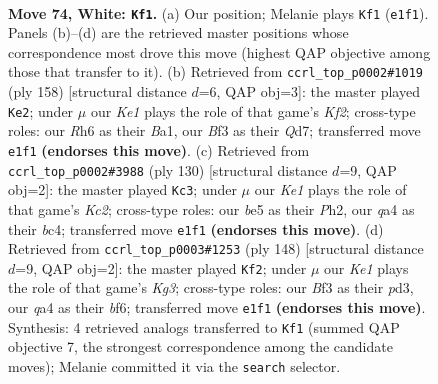 \documentclass[11pt]{article}
\begin{document}
\clearpage

\begin{figure}[p]\centering
\begin{subfigure}{0.46\textwidth}\centering
\resizebox{\linewidth}{!}{%
\newchessgame
\chessboard[
  setfen={8/8/7R/4b3/q7/1p1k1B2/8/4K3 w - - 4 74},
  showmover=false,
  pgfstyle=straightmove, color=movearrow, markmove={e1-f1}
]}
\caption{}
\end{subfigure}\hfill
\begin{subfigure}{0.46\textwidth}\centering
\resizebox{\linewidth}{!}{%
\newchessgame
\chessboard[
  setfen={8/3Q4/8/q7/5k2/p7/5K2/B7 w - - 2 80},
  showmover=false,
  pgfstyle=straightmove, color=movearrow, markmove={f2-e2}
]}
\caption{}
\end{subfigure}
\\[4pt]
\begin{subfigure}{0.46\textwidth}\centering
\resizebox{\linewidth}{!}{%
\newchessgame
\chessboard[
  setfen={8/8/8/8/2b5/4k3/2K2pBP/8 w - - 12 66},
  showmover=false,
  pgfstyle=straightmove, color=movearrow, markmove={c2-c3}
]}
\caption{}
\end{subfigure}\hfill
\begin{subfigure}{0.46\textwidth}\centering
\resizebox{\linewidth}{!}{%
\newchessgame
\chessboard[
  setfen={8/8/5bp1/8/4k3/3p2K1/8/7R w - - 4 75},
  showmover=false,
  pgfstyle=straightmove, color=movearrow, markmove={g3-f2}
]}
\caption{}
\end{subfigure}
\caption{\textbf{Move 74, White: \texttt{Kf1}.} (a) Our position; Melanie plays \texttt{Kf1} (\texttt{e1f1}). Panels (b)--(d) are the retrieved master positions whose correspondence most drove this move (highest QAP objective among those that transfer to it). (b) Retrieved from \texttt{ccrl\_top\_p0002\#1019} (ply 158) [structural distance $d$=6, QAP obj=3]: the master played \texttt{Ke2}; under $\mu$ our \emph{Ke1} plays the role of that game's \emph{Kf2}; cross-type roles: our \emph{R}h6 as their \emph{B}a1, our \emph{B}f3 as their \emph{Q}d7; transferred move \texttt{e1f1} \textbf{(endorses this move)}. (c) Retrieved from \texttt{ccrl\_top\_p0002\#3988} (ply 130) [structural distance $d$=9, QAP obj=2]: the master played \texttt{Kc3}; under $\mu$ our \emph{Ke1} plays the role of that game's \emph{Kc2}; cross-type roles: our \emph{b}e5 as their \emph{P}h2, our \emph{q}a4 as their \emph{b}c4; transferred move \texttt{e1f1} \textbf{(endorses this move)}. (d) Retrieved from \texttt{ccrl\_top\_p0003\#1253} (ply 148) [structural distance $d$=9, QAP obj=2]: the master played \texttt{Kf2}; under $\mu$ our \emph{Ke1} plays the role of that game's \emph{Kg3}; cross-type roles: our \emph{B}f3 as their \emph{p}d3, our \emph{q}a4 as their \emph{b}f6; transferred move \texttt{e1f1} \textbf{(endorses this move)}. Synthesis: 4 retrieved analogs transferred to \texttt{Kf1} (summed QAP objective 7, the strongest correspondence among the candidate moves); Melanie committed it via the \texttt{search} selector.}
\label{fig:thought-m146}
\end{figure}
\end{document}
